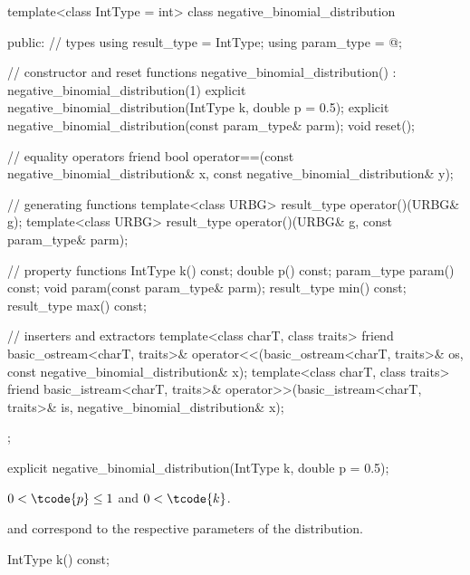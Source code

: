 %
%
\begin{codeblock}
template<class IntType = int>
  class negative_binomial_distribution {
  public:
    // types
    using result_type = IntType;
    using param_type  = @\unspec@;

    // constructor and reset functions
    negative_binomial_distribution() : negative_binomial_distribution(1) {}
    explicit negative_binomial_distribution(IntType k, double p = 0.5);
    explicit negative_binomial_distribution(const param_type& parm);
    void reset();

    // equality operators
    friend bool operator==(const negative_binomial_distribution& x,
                           const negative_binomial_distribution& y);

    // generating functions
    template<class URBG>
      result_type operator()(URBG& g);
    template<class URBG>
      result_type operator()(URBG& g, const param_type& parm);

    // property functions
    IntType k() const;
    double p() const;
    param_type param() const;
    void param(const param_type& parm);
    result_type min() const;
    result_type max() const;

    // inserters and extractors
    template<class charT, class traits>
      friend basic_ostream<charT, traits>&
        operator<<(basic_ostream<charT, traits>& os, const negative_binomial_distribution& x);
    template<class charT, class traits>
      friend basic_istream<charT, traits>&
        operator>>(basic_istream<charT, traits>& is, negative_binomial_distribution& x);
  };
\end{codeblock}


%
\begin{itemdecl}
explicit negative_binomial_distribution(IntType k, double p = 0.5);
\end{itemdecl}

\begin{itemdescr}
\pnum
\expects
$0 < \tcode{p} \leq 1$
and $0 < \tcode{k} $.

\pnum
\remarks
  and 
 correspond to the respective parameters of the distribution.
\end{itemdescr}

%
\begin{itemdecl}
IntType k() const;
\end{itemdecl}


